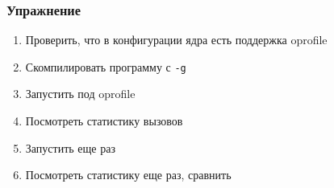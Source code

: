 \begin{frame}
 \frametitle{Упражнение}
 \begin{enumerate}
  \item Проверить, что в конфигурации ядра есть поддержка oprofile
  \item Скомпилировать программу с \texttt{-g}
  \item Запустить под oprofile
  \item Посмотреть статистику вызовов
  \item Запустить еще раз
  \item Посмотреть статистику еще раз, сравнить
 \end{enumerate}
\end{frame}
